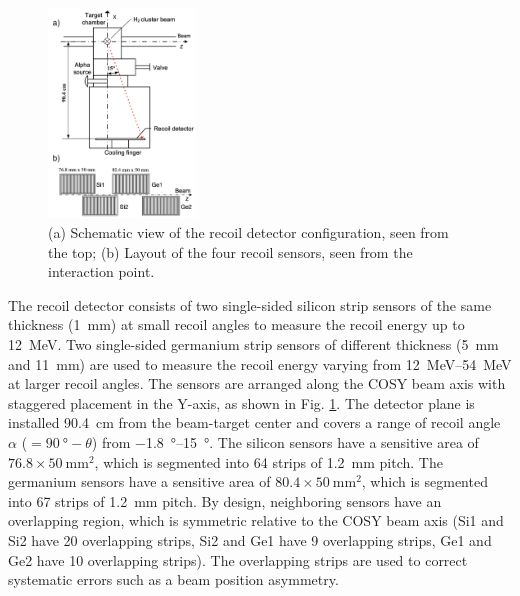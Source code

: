 \documentclass[number,5p]{elsarticle}
\begin{document}
\begin{figure}[htbp]
  \centering
  \includegraphics[width=0.35\textwidth]{./recoil_schematic.png}
  \caption{(a) Schematic view of the recoil detector configuration, seen from the
    top; (b) Layout of the four recoil sensors, seen from the interaction point.}
  \label{fig:recoil_schematic}
\end{figure}
The recoil detector consists of two single-sided silicon strip sensors of the same
thickness (\SI{1}{\mm}) at small recoil angles to measure the recoil energy up
to \SI{12}{\MeV}.
Two single-sided germanium strip sensors of different thickness (\SI{5}{\mm} and
\SI{11}{\mm}) are used to measure the recoil energy varying from
\SIrange{12}{54}{\MeV} at larger recoil angles.
The sensors are arranged along the COSY beam axis with staggered placement in
the Y-axis, as shown in Fig. \ref{fig:recoil_schematic}.
The detector plane is installed \SI{90.4}{\cm} from the beam-target center
and covers a range of recoil angle $\alpha$ ($=\SI{90}{\degree}-\theta$) from \SIrange[range-units=repeat]{-1.8}{15}{\degree}.
The silicon sensors have a sensitive area of $76.8 \times \SI{50}{\mm\squared}$, which is
segmented into 64 strips of \SI{1.2}{\mm} pitch.
The germanium sensors have a sensitive area of \(80.4 \times \SI{50}{\mm\squared}\), which is segmented into 67 strips of \SI{1.2}{\mm} pitch.
By design, neighboring sensors have an overlapping region, which is symmetric
relative to the COSY beam axis (Si1 and Si2 have 20 overlapping strips, Si2 and Ge1
have 9 overlapping strips, Ge1 and Ge2 have 10 overlapping strips).
The overlapping strips are used to correct systematic errors such as a beam position asymmetry.
\end{document}
